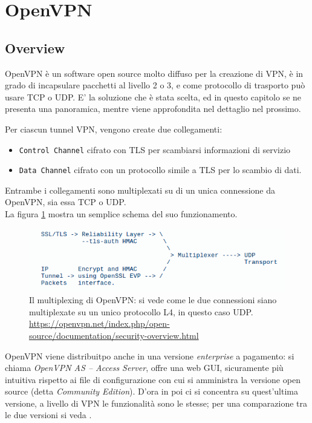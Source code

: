 \section{OpenVPN}
\subsection{Overview}
OpenVPN \cite{openvpn} è un software open source molto diffuso per la creazione di VPN,
è in grado di incapsulare pacchetti al livello 2 o 3, e come protocollo di trasporto
può usare TCP o UDP. E' la soluzione che è stata scelta, ed in questo capitolo
se ne presenta una panoramica, mentre viene approfondita nel dettaglio
nel prossimo.

Per ciascun tunnel VPN, vengono create due collegamenti:
\begin{itemize}
  \item \texttt{Control Channel} cifrato con TLS per scambiarsi informazioni di servizio
  \item \texttt{Data Channel} cifrato con un protocollo simile a TLS per lo scambio
  di dati.
\end{itemize}
Entrambe i collegamenti sono multiplexati su di un unica connessione
da OpenVPN, sia essa TCP o UDP\cite{openvpn-security}.\\
La figura \ref{fig:openvpn-sec} mostra un semplice schema del suo funzionamento.\\
\begin{figure}[h!]
  \includegraphics[scale=0.4]{img/openvpn_sec}
  \caption[Il multiplexing di OpenVPN]{Il multiplexing di OpenVPN: si vede come
  le due connessioni siano multiplexate su un unico protocollo L4, in questo caso UDP.
  \url{https://openvpn.net/index.php/open-source/documentation/security-overview.html}}
  \label{fig:openvpn-sec}
\end{figure}
OpenVPN viene distribuitpo anche in una versione \textit{enterprise} a pagamento: si chiama
\textit{OpenVPN AS -- Access Server}, offre una web GUI, sicuramente più intuitiva
rispetto ai file di configurazione con cui si amministra la versione open source
(detta \textit{Community Edition})\cite{openvpn-intro}. D'ora in poi ci si concentra su quest'ultima
versione, a livello di VPN le funzionalità sono le stesse; per una comparazione tra
le due versioni si veda
\cite{openvpn-comparison}.

